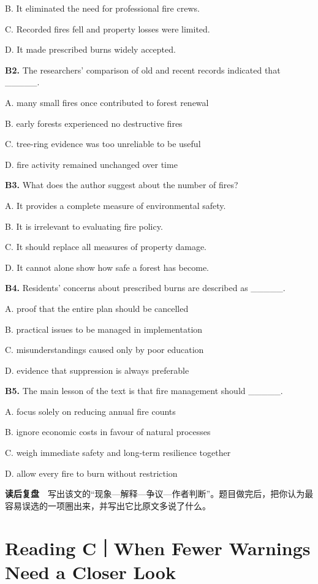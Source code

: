 \documentclass[a4paper,11pt,openany]{report}
\begin{document}
B. It eliminated the need for professional fire crews.

C. Recorded fires fell and property losses were limited.

D. It made prescribed burns widely accepted.

\textbf{B2.} The researchers' comparison of old and recent records indicated that \_\_\_\_\_.

A. many small fires once contributed to forest renewal

B. early forests experienced no destructive fires

C. tree-ring evidence was too unreliable to be useful

D. fire activity remained unchanged over time

\textbf{B3.} What does the author suggest about the number of fires?

A. It provides a complete measure of environmental safety.

B. It is irrelevant to evaluating fire policy.

C. It should replace all measures of property damage.

D. It cannot alone show how safe a forest has become.

\textbf{B4.} Residents' concerns about prescribed burns are described as \_\_\_\_\_.

A. proof that the entire plan should be cancelled

B. practical issues to be managed in implementation

C. misunderstandings caused only by poor education

D. evidence that suppression is always preferable

\textbf{B5.} The main lesson of the text is that fire management should \_\_\_\_\_.

A. focus solely on reducing annual fire counts

B. ignore economic costs in favour of natural processes

C. weigh immediate safety and long-term resilience together

D. allow every fire to burn without restriction

\textbf{读后复盘}　写出该文的``现象---解释---争议---作者判断''。题目做完后，把你认为最容易误选的一项圈出来，并写出它比原文多说了什么。

\section{Reading C｜When Fewer Warnings Need a Closer Look}\label{reading-cwhen-fewer-warnings-need-a-closer-look}
\end{document}
